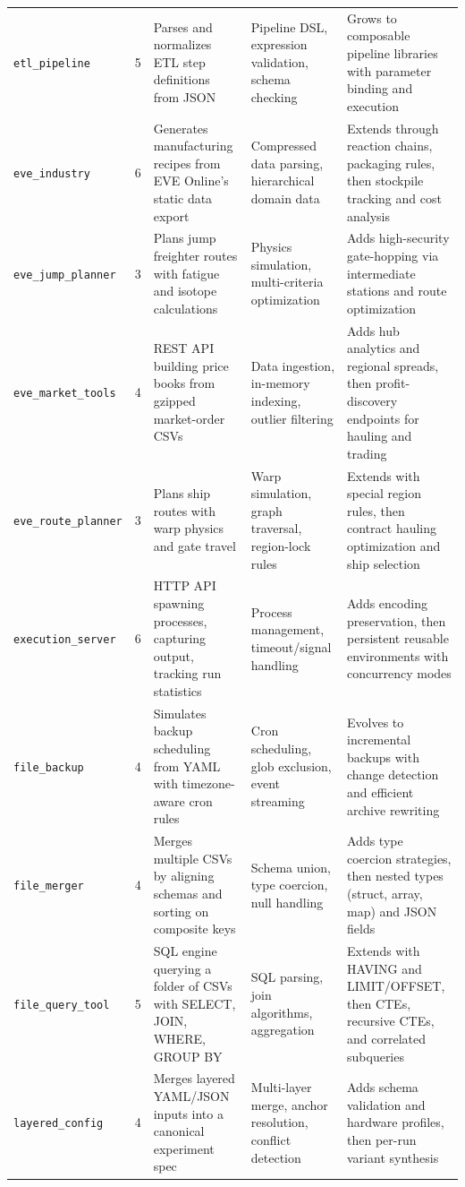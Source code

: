 \begin{table}[h]
\begin{tabular}{lcp{3.6cm}p{3.2cm}p{3.6cm}}
\texttt{etl\_pipeline}       & 5 & Parses and normalizes ETL step definitions from JSON & Pipeline DSL, expression validation, schema checking & Grows to composable pipeline libraries with parameter binding and execution \\[4pt]
\texttt{eve\_industry}       & 6 & Generates manufacturing recipes from EVE Online's static data export & Compressed data parsing, hierarchical domain data & Extends through reaction chains, packaging rules, then stockpile tracking and cost analysis \\[4pt]
\texttt{eve\_jump\_planner}  & 3 & Plans jump freighter routes with fatigue and isotope calculations & Physics simulation, multi-criteria optimization & Adds high-security gate-hopping via intermediate stations and route optimization \\[4pt]
\texttt{eve\_market\_tools}  & 4 & REST API building price books from gzipped market-order CSVs & Data ingestion, in-memory indexing, outlier filtering & Adds hub analytics and regional spreads, then profit-discovery endpoints for hauling and trading \\[4pt]
\texttt{eve\_route\_planner} & 3 & Plans ship routes with warp physics and gate travel & Warp simulation, graph traversal, region-lock rules & Extends with special region rules, then contract hauling optimization and ship selection \\[4pt]
\texttt{execution\_server}   & 6 & HTTP API spawning processes, capturing output, tracking run statistics & Process management, timeout/signal handling & Adds encoding preservation, then persistent reusable environments with concurrency modes \\[4pt]
\texttt{file\_backup}        & 4 & Simulates backup scheduling from YAML with timezone-aware cron rules & Cron scheduling, glob exclusion, event streaming & Evolves to incremental backups with change detection and efficient archive rewriting \\[4pt]
\texttt{file\_merger}        & 4 & Merges multiple CSVs by aligning schemas and sorting on composite keys & Schema union, type coercion, null handling & Adds type coercion strategies, then nested types (struct, array, map) and JSON fields \\[4pt]
\texttt{file\_query\_tool}   & 5 & SQL engine querying a folder of CSVs with SELECT, JOIN, WHERE, GROUP BY & SQL parsing, join algorithms, aggregation & Extends with HAVING and LIMIT/OFFSET, then CTEs, recursive CTEs, and correlated subqueries \\[4pt]
\texttt{layered\_config}     & 4 & Merges layered YAML/JSON inputs into a canonical experiment spec & Multi-layer merge, anchor resolution, conflict detection & Adds schema validation and hardware profiles, then per-run variant synthesis \\[4pt]

\end{tabular}
\end{table}
